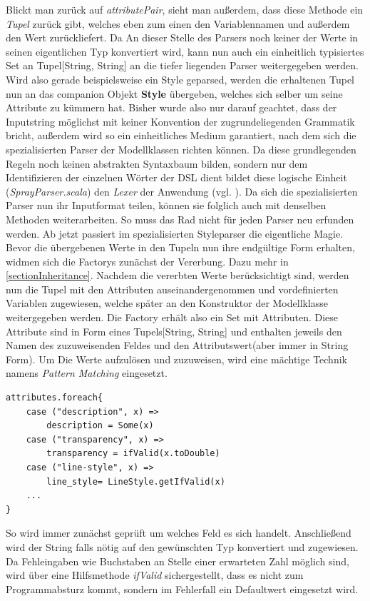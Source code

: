 Blickt man zurück auf \textit{attributePair}, sieht man außerdem, dass diese Methode ein \textit{Tupel} zurück gibt, welches eben zum einen den Variablennamen und außerdem den Wert zurückliefert.
Da An dieser Stelle des Parsers noch keiner der Werte in seinen eigentlichen Typ konvertiert wird, kann nun auch ein einheitlich typisiertes Set an Tupel[String, String] an die tiefer liegenden Parser weitergegeben werden.
Wird also gerade beispielsweise ein Style geparsed, werden die erhaltenen Tupel nun an das companion Objekt \textbf{Style} übergeben, welches sich selber um seine Attribute zu kümmern hat.
Bisher wurde also nur darauf geachtet, dass der Inputstring möglichst mit keiner Konvention der zugrundeliegenden Grammatik bricht, außerdem wird so ein einheitliches Medium garantiert, nach dem sich die spezialisierten Parser der Modellklassen richten können. Da diese grundlegenden Regeln noch keinen abstrakten Syntaxbaum bilden, sondern nur dem Identifizieren der einzelnen Wörter der DSL dient bildet diese logische Einheit (\textit{SprayParser.scala}) den \textit{Lexer} der Anwendung (vgl. \citet{parsing}).
Da sich die spezialisierten Parser nun ihr Inputformat teilen, können sie folglich auch mit denselben Methoden weiterarbeiten.
So muss das Rad nicht für jeden Parser neu erfunden werden.
Ab jetzt passiert im spezialisierten Styleparser die eigentliche Magie.
Bevor die übergebenen Werte in den Tupeln nun ihre endgültige Form erhalten, widmen sich die Factorys zunächst der Vererbung. Dazu mehr in \ref{sectionInheritance}.
Nachdem die vererbten Werte berücksichtigt sind, werden nun die Tupel mit den Attributen auseinandergenommen und vordefinierten Variablen zugewiesen, welche später an den Konstruktor der Modellklasse weitergegeben werden.
Die Factory erhält also ein Set mit Attributen. Diese Attribute sind in Form eines Tupels[String, String] und enthalten jeweils den Namen des zuzuweisenden Feldes und den Attributswert(aber immer in String Form). Um Die Werte aufzulösen und zuzuweisen, wird eine mächtige Technik namens \textit{Pattern Matching} eingesetzt.
\begin{lstlisting}[style=scala]
attributes.foreach{
    case ("description", x) => 
    	description = Some(x)
    case ("transparency", x) => 
    	transparency = ifValid(x.toDouble)
    case ("line-style", x) => 
    	line_style= LineStyle.getIfValid(x)
    ...
}
\end{lstlisting}
So wird immer zunächst geprüft um welches Feld es sich handelt. Anschließend wird der String falls nötig auf den gewünschten Typ konvertiert und zugewiesen. Da Fehleingaben wie Buchstaben an Stelle einer erwarteten Zahl möglich sind, wird über eine Hilfsmethode \textit{ifValid} sichergestellt, dass es nicht zum Programmabsturz kommt, sondern im Fehlerfall ein Defaultwert eingesetzt wird.
